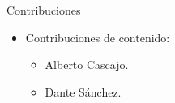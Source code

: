 \begin{frame}[t]{Contribuciones}
\begin{itemize}
  \item Contribuciones de contenido:
    \begin{itemize}
      \item Alberto Cascajo.
      \item Dante Sánchez.
    \end{itemize}
\end{itemize}
\end{frame}

